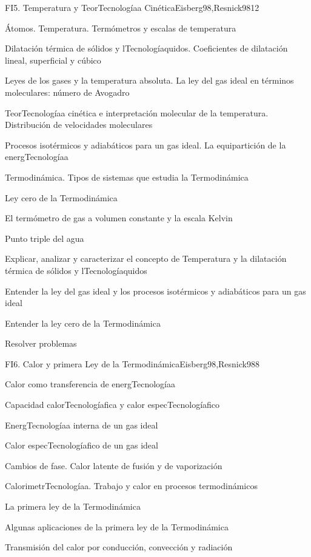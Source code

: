 \begin{syllabus}
\begin{unit}{FI5. Temperatura y TeorTecnologíaa Cinética}{Eisberg98,Resnick98}{12}
\begin{topics}
         \item  Átomos. Temperatura. Termómetros y escalas de temperatura
	 \item  Dilatación térmica de sólidos y lTecnologíaquidos. Coeficientes de dilatación lineal, superficial y cúbico
         \item  Leyes de los gases y la temperatura absoluta. La ley del gas ideal en términos moleculares: número de Avogadro
	 \item  TeorTecnologíaa cinética e interpretación molecular de la temperatura. Distribución de velocidades moleculares
         \item  Procesos isotérmicos y adiabáticos para un gas ideal. La equipartición de la energTecnologíaa
	 \item  Termodinámica. Tipos de sistemas que estudia la Termodinámica
         \item  Ley cero de la Termodinámica
	 \item  El termómetro de gas a volumen constante y la escala Kelvin
         \item  Punto triple del agua
   \end{topics}

   \begin{unitgoals}
         \item  Explicar, analizar y caracterizar el concepto de Temperatura y la dilatación térmica de sólidos y lTecnologíaquidos
         \item  Entender la ley del gas ideal y los procesos isotérmicos y adiabáticos para un gas ideal
         \item  Entender la ley cero de la Termodinámica
         \item  Resolver problemas
   \end{unitgoals}
\end{unit}

\begin{unit}{FI6. Calor y primera Ley de la Termodinámica}{Eisberg98,Resnick98}{8}
\begin{topics}
         \item  Calor como transferencia de energTecnologíaa
	 \item  Capacidad calorTecnologíafica y calor especTecnologíafico
         \item  EnergTecnologíaa interna de un gas ideal
	 \item  Calor especTecnologíafico de un gas ideal
         \item  Cambios de fase. Calor latente de fusión y de vaporización
	 \item  CalorimetrTecnologíaa. Trabajo y calor en procesos termodinámicos
         \item  La primera ley de la Termodinámica
	 \item  Algunas aplicaciones de la primera ley de la Termodinámica
         \item  Transmisión del calor por conducción, convección y radiación
   \end{topics}


\end{unit}
\end{syllabus}
